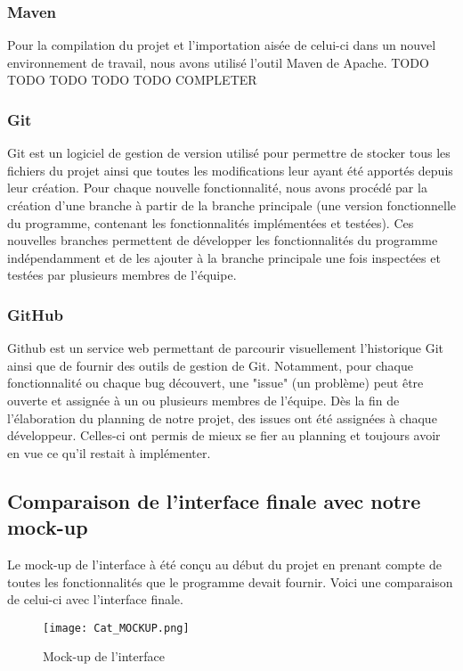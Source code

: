 \subsubsection{Maven}
Pour la compilation du projet et l'importation aisée de celui-ci dans un nouvel environnement de travail, nous avons utilisé l'outil Maven de Apache.
TODO TODO TODO TODO TODO COMPLETER

\subsubsection{Git}
Git est un logiciel de gestion de version utilisé pour permettre de stocker tous les fichiers du projet ainsi que toutes les modifications leur ayant été apportés depuis leur création. Pour chaque nouvelle fonctionnalité, nous avons procédé par la création d'une branche à partir de la branche principale (une version fonctionnelle du programme, contenant les fonctionnalités implémentées et testées). Ces nouvelles branches permettent de développer les fonctionnalités du programme indépendamment et de les ajouter à la branche principale une fois inspectées et testées par plusieurs membres de l'équipe.

\subsubsection{GitHub}
Github est un service web permettant de parcourir visuellement l'historique Git ainsi que de fournir des outils de gestion de Git. Notamment, pour chaque fonctionnalité ou chaque bug découvert, une "issue" (un problème) peut être ouverte et assignée à un ou plusieurs membres de l'équipe. Dès la fin de l'élaboration du planning de notre projet, des issues ont été assignées à chaque développeur. Celles-ci ont permis de mieux se fier au planning et toujours avoir en vue ce qu'il restait à implémenter.

\subsection{Comparaison de l'interface finale avec notre mock-up}
Le mock-up de l'interface à été conçu au début du projet en prenant compte de toutes les fonctionnalités que le programme devait fournir. Voici une comparaison de celui-ci avec l'interface finale.

\begin{figure}[H]
	\caption{Mock-up de l'interface}
	\centering
	\texttt{[image: Cat\_MOCKUP.png]}
	\label{fig:cat_mockup}
\end{figure}

